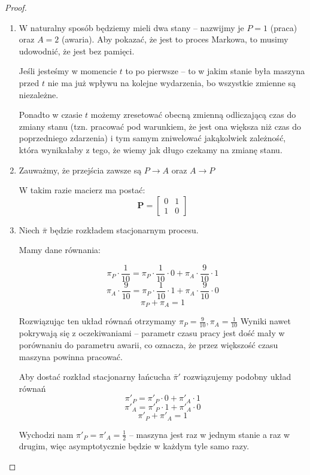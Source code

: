 \begin{proof} \( \) %
	\begin{enumerate}
		\item W naturalny sposób będziemy mieli dwa stany -- nazwijmy je \( P = 1 \) (praca) oraz \( A = 2 \) (awaria).
		      Aby pokazać, że jest to proces Markowa, to musimy udowodnić, że jest bez pamięci.

		      Jeśli jesteśmy w momencie \( t \) to po pierwsze -- to w jakim stanie była maszyna przed \( t \)
		      nie ma już wpływu na kolejne wydarzenia, bo wszystkie zmienne są niezależne.

		      Ponadto w czasie \( t \) możemy zresetować obecną zmienną odliczającą czas do zmiany stanu
		      (tzn. pracować pod warunkiem, że jest ona większa niż czas do poprzedniego zdarzenia)
		      i tym samym zniwelować jakąkolwiek zależność, która wynikałaby z tego, że wiemy jak długo czekamy na zmianę stanu.

		\item Zauważmy, że przejścia zawsze są \( P \rightarrow A \) oraz \( A \rightarrow P \)

		      W takim razie macierz ma postać:
		      \[
			      \mathbf{P} = \begin{bmatrix}
				      0 & 1 \\
				      1 & 0
			      \end{bmatrix}
		      \]

		\item Niech \( \bar \pi \) będzie rozkładem stacjonarnym procesu.

		      Mamy dane równania:

		      \[
			      \pi_P \cdot \frac{1}{10} = \pi_P \cdot \frac{1}{10} \cdot 0 + \pi_A \cdot \frac{9}{10} \cdot 1
		      \]
		      \[
			      \pi_A \cdot \frac{9}{10} = \pi_P \cdot \frac{1}{10} \cdot 1 + \pi_A \cdot \frac{9}{10} \cdot 0
		      \]
		      \[
			      \pi_P + \pi_A = 1
		      \]

		      Rozwiązując ten układ równań otrzymamy \( \pi_P = \frac{9}{10}, \pi_A = \frac{1}{10} \)
		      Wyniki nawet pokrywają się z oczekiwaniami -- parametr czasu pracy jest dość mały w porównaniu do parametru awarii,
		      co oznacza, że przez większość czasu maszyna powinna pracować.

		      Aby dostać rozkład stacjonarny łańcucha \( \bar \pi' \) rozwiązujemy podobny układ równań
		      \[
			      \pi'_P = \pi'_P \cdot 0 + \pi'_A \cdot 1
		      \]
		      \[
			      \pi'_A = \pi'_P \cdot 1 + \pi'_A \cdot 0
		      \]
		      \[
			      \pi'_P + \pi'_A = 1
		      \]

		      Wychodzi nam \( \pi'_P = \pi'_A = \frac{1}{2} \) -- maszyna jest raz w jednym stanie a raz w drugim, więc asymptotycznie będzie w każdym tyle samo razy.

	\end{enumerate}
\end{proof}